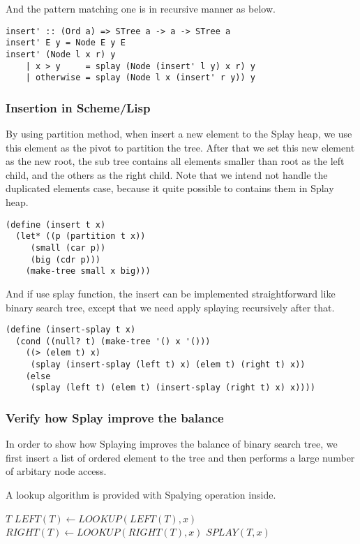 \documentclass{article}
\begin{document}
And the pattern matching one is in recursive manner as below.

\begin{lstlisting}
insert' :: (Ord a) => STree a -> a -> STree a
insert' E y = Node E y E
insert' (Node l x r) y 
    | x > y     = splay (Node (insert' l y) x r) y
    | otherwise = splay (Node l x (insert' r y)) y
\end{lstlisting}

\subsubsection*{Insertion in Scheme/Lisp}

By using partition method, when insert a new element to the Splay
heap, we use this element as the pivot to partition the tree.
After that we set this new element as the new root, the sub tree
contains all elements smaller than root as the left child, and
the others as the right child. Note that we intend not handle the
duplicated elements case, because it quite possible to contains
them in Splay heap.

\lstset{language=lisp}
\begin{lstlisting}
(define (insert t x)
  (let* ((p (partition t x))
	 (small (car p))
	 (big (cdr p)))
    (make-tree small x big)))
\end{lstlisting}

And if use splay function, the insert can be implemented straightforward
like binary search tree, except that we need apply splaying recursively 
after that.

\begin{lstlisting}
(define (insert-splay t x)
  (cond ((null? t) (make-tree '() x '()))
	((> (elem t) x)
	 (splay (insert-splay (left t) x) (elem t) (right t) x))
	(else
	 (splay (left t) (elem t) (insert-splay (right t) x) x))))
\end{lstlisting}

\subsubsection{Verify how Splay improve the balance}
In order to show how Splaying improves the balance of binary search
tree, we first insert a list of ordered element to the tree and then
performs a large number of arbitary node access.

A lookup algorithm is provided with Spalying operation inside. 

\begin{algorithmic}[1]
    \State \Return $T$
    \State $LEFT(T) \gets LOOKUP(LEFT(T), x)$
  \Else
    \State $RIGHT(T) \gets LOOKUP(RIGHT(T), x)$
  \EndIf
  \State \Return $SPLAY(T, x)$
\EndFunction
\end{algorithmic}
\end{document}

